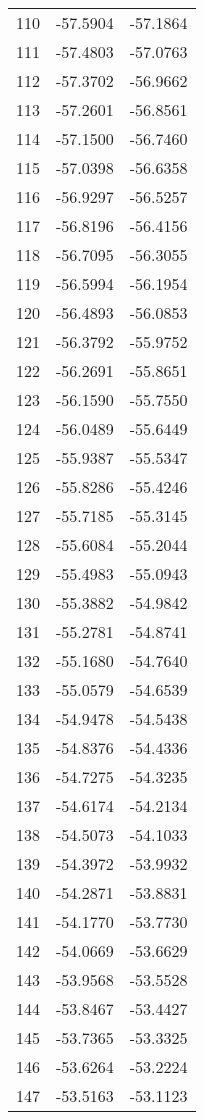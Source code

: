 \documentclass{article}
\begin{document}
\begin{longtable}{|c|c|c|}
110 & -57.5904 & -57.1864 \\
111 & -57.4803 & -57.0763 \\
112 & -57.3702 & -56.9662 \\
113 & -57.2601 & -56.8561 \\
114 & -57.1500 & -56.7460 \\
115 & -57.0398 & -56.6358 \\
116 & -56.9297 & -56.5257 \\
117 & -56.8196 & -56.4156 \\
118 & -56.7095 & -56.3055 \\
119 & -56.5994 & -56.1954 \\
120 & -56.4893 & -56.0853 \\
121 & -56.3792 & -55.9752 \\
122 & -56.2691 & -55.8651 \\
123 & -56.1590 & -55.7550 \\
124 & -56.0489 & -55.6449 \\
125 & -55.9387 & -55.5347 \\
126 & -55.8286 & -55.4246 \\
127 & -55.7185 & -55.3145 \\
128 & -55.6084 & -55.2044 \\
129 & -55.4983 & -55.0943 \\
130 & -55.3882 & -54.9842 \\
131 & -55.2781 & -54.8741 \\
132 & -55.1680 & -54.7640 \\
133 & -55.0579 & -54.6539 \\
134 & -54.9478 & -54.5438 \\
135 & -54.8376 & -54.4336 \\
136 & -54.7275 & -54.3235 \\
137 & -54.6174 & -54.2134 \\
138 & -54.5073 & -54.1033 \\
139 & -54.3972 & -53.9932 \\
140 & -54.2871 & -53.8831 \\
141 & -54.1770 & -53.7730 \\
142 & -54.0669 & -53.6629 \\
143 & -53.9568 & -53.5528 \\
144 & -53.8467 & -53.4427 \\
145 & -53.7365 & -53.3325 \\
146 & -53.6264 & -53.2224 \\
147 & -53.5163 & -53.1123 \\

\end{longtable}
\end{document}
